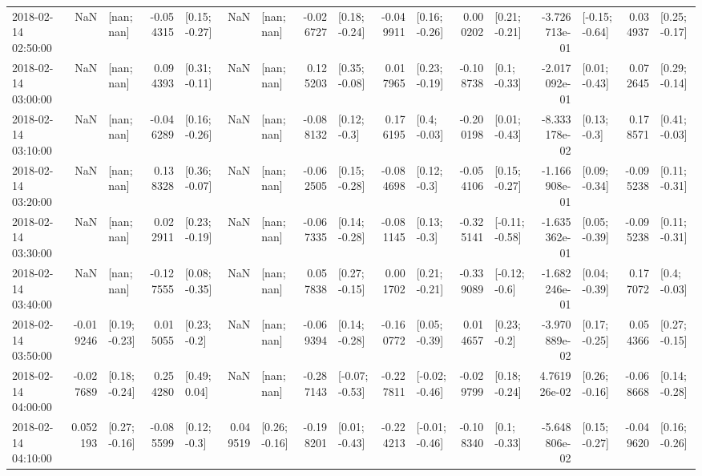 \begin{tabular}{lrlrlrlrlrlrlrlrl}
2018-02-14 02:50:00 &       NaN &      [nan; nan] & -0.054315 &   [0.15; -0.27] &       NaN &      [nan; nan] & -0.026727 &   [0.18; -0.24] & -0.049911 &   [0.16; -0.26] &  0.000202 &   [0.21; -0.21] & -3.726713e-01 &  [-0.15; -0.64] &  0.034937 &   [0.25; -0.17] \\
2018-02-14 03:00:00 &       NaN &      [nan; nan] &  0.094393 &   [0.31; -0.11] &       NaN &      [nan; nan] &  0.125203 &   [0.35; -0.08] &  0.017965 &   [0.23; -0.19] & -0.108738 &    [0.1; -0.33] & -2.017092e-01 &   [0.01; -0.43] &  0.072645 &   [0.29; -0.14] \\
2018-02-14 03:10:00 &       NaN &      [nan; nan] & -0.046289 &   [0.16; -0.26] &       NaN &      [nan; nan] & -0.088132 &    [0.12; -0.3] &  0.176195 &    [0.4; -0.03] & -0.200198 &   [0.01; -0.43] & -8.333178e-02 &    [0.13; -0.3] &  0.178571 &   [0.41; -0.03] \\
2018-02-14 03:20:00 &       NaN &      [nan; nan] &  0.138328 &   [0.36; -0.07] &       NaN &      [nan; nan] & -0.062505 &   [0.15; -0.28] & -0.084698 &    [0.12; -0.3] & -0.054106 &   [0.15; -0.27] & -1.166908e-01 &   [0.09; -0.34] & -0.095238 &   [0.11; -0.31] \\
2018-02-14 03:30:00 &       NaN &      [nan; nan] &  0.022911 &   [0.23; -0.19] &       NaN &      [nan; nan] & -0.067335 &   [0.14; -0.28] & -0.081145 &    [0.13; -0.3] & -0.325141 &  [-0.11; -0.58] & -1.635362e-01 &   [0.05; -0.39] & -0.095238 &   [0.11; -0.31] \\
2018-02-14 03:40:00 &       NaN &      [nan; nan] & -0.127555 &   [0.08; -0.35] &       NaN &      [nan; nan] &  0.057838 &   [0.27; -0.15] &  0.001702 &   [0.21; -0.21] & -0.339089 &   [-0.12; -0.6] & -1.682246e-01 &   [0.04; -0.39] &  0.177072 &    [0.4; -0.03] \\
2018-02-14 03:50:00 & -0.019246 &   [0.19; -0.23] &  0.015055 &    [0.23; -0.2] &       NaN &      [nan; nan] & -0.069394 &   [0.14; -0.28] & -0.160772 &   [0.05; -0.39] &  0.014657 &    [0.23; -0.2] & -3.970889e-02 &   [0.17; -0.25] &  0.054366 &   [0.27; -0.15] \\
2018-02-14 04:00:00 & -0.027689 &   [0.18; -0.24] &  0.254280 &    [0.49; 0.04] &       NaN &      [nan; nan] & -0.287143 &  [-0.07; -0.53] & -0.227811 &  [-0.02; -0.46] & -0.029799 &   [0.18; -0.24] &  4.761926e-02 &   [0.26; -0.16] & -0.068668 &   [0.14; -0.28] \\
2018-02-14 04:10:00 &  0.052193 &   [0.27; -0.16] & -0.085599 &    [0.12; -0.3] &  0.049519 &   [0.26; -0.16] & -0.198201 &   [0.01; -0.43] & -0.224213 &  [-0.01; -0.46] & -0.108340 &    [0.1; -0.33] & -5.648806e-02 &   [0.15; -0.27] & -0.049620 &   [0.16; -0.26] \\

\end{tabular}
